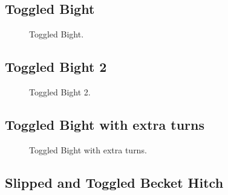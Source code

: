 \subsection{Toggled Bight}

\begin{figure}[H]\centering
	\begin{minipage}{1\linewidth}
		\begin{center}
			\tcbox[enhanced jigsaw,colframe=black,opacityframe=0.5,opacityback=0.5]
			{\centering{}}
		\end{center}
	\end{minipage}
\caption{Toggled Bight.}
\label{ris:Toggled_Bight}
\end{figure}

\subsection{Toggled Bight 2}

\begin{figure}[H]\centering
	\begin{minipage}{1\linewidth}
		\begin{center}
			\tcbox[enhanced jigsaw,colframe=black,opacityframe=0.5,opacityback=0.5]
			{\centering{}}
		\end{center}
	\end{minipage}
\caption{Toggled Bight 2.}
\label{ris:Toggled_Bight_2}
\end{figure}

\subsection{Toggled Bight with extra turns}

\begin{figure}[H]\centering
	\begin{minipage}{1\linewidth}
		\begin{center}
			\tcbox[enhanced jigsaw,colframe=black,opacityframe=0.5,opacityback=0.5]
			{\centering{}}
		\end{center}
	\end{minipage}
\caption{Toggled Bight with extra turns.}
\label{ris:Toggled_Bight_with_extra_turns}
\end{figure}

\subsection{Slipped and Toggled Becket Hitch}

